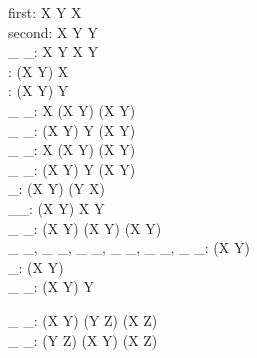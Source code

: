 \begin{gendef}[X,Y]
        first: X \cross Y \fun X \\
        second: X \cross Y \fun Y \\
        \_ \mapsto \_: X \cross Y \fun X \cross Y \\
        \dom: (X \rel Y) \fun \power X \\
        \ran: (X \rel Y) \fun \power Y \\
        \_ \dres \_: \power X \cross (X \rel Y) \fun (X \rel Y) \\
        \_ \rres \_: (X \rel Y) \cross \power Y \fun (X \rel Y) \\
        \_ \ndres \_: \power X \cross (X \rel Y) \fun (X \rel Y) \\
        \_ \nrres \_: (X \rel Y) \cross \power Y \fun (X \rel Y) \\
        \_\inv: (X \rel Y) \fun (Y \rel X) \\
        \_\limg\_\rimg: (X \rel Y) \cross \power X \fun \power Y \\
        \_ \oplus \_: (X \rel Y) \cross (X \rel Y) \fun (X \rel Y) \\
	\_ \pinj \_, \_ \inj \_, \_ \psurj \_, 
	\_ \surj \_, \_ \bij \_, \_ \finj \_: \power(X \pfun Y) \\
        \disjoint \_: \power (X \pfun \power Y) \\
        \_ \partition \_: (X \pfun \power Y) \rel \power Y
\end{gendef}

\begin{gendef}[X,Y,Z]
        \_ \comp \_: (X \rel Y) \cross (Y \rel Z) \fun (X \rel Z) \\
	\_ \circ \_: (Y \rel Z) \cross (X \rel Y) \fun (X \rel Z)
\end{gendef}


\newcommand{\R}{\mathbb{R}}
\newcommand{\Rpos}{\R_{+}}
\newcommand{\Rnz}{\R_{*}}


